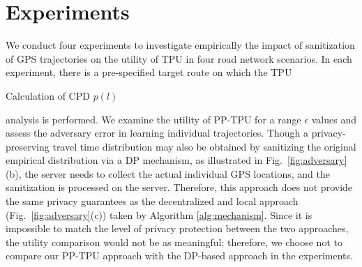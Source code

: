 \documentclass[10pt,journal,compsoc]{IEEEtran}
\begin{document}
\vspace{-9pt}\section{Experiments}\label{sec:exp}\vspace{-3pt}
We conduct four experiments to investigate empirically the impact of sanitization of GPS trajectories on the utility of TPU in four road network scenarios. In each experiment, there is a pre-specified target route on which the TPU 
\setlength{\textfloatsep}{0pt}
\begin{algorithm}
\caption{Calculation of CPD $p(l)$}\label{alg:CPD}
\SetAlgoLined
{}
\end{algorithm} 
analysis is performed.  We examine the utility of PP-TPU for a range $\epsilon$ values and assess the adversary error in learning individual trajectories. Though a privacy-preserving travel time distribution may also be obtained by sanitizing the original empirical distribution via a DP mechanism, as illustrated in Fig.~\ref{fig:adversary}(b), the server needs to collect the actual individual GPS locations, and the sanitization is processed on the server. Therefore, this approach does not provide the same privacy guarantees as the decentralized and local approach (Fig.~\ref{fig:adversary}(c)) taken by Algorithm \ref{alg:mechanism}. Since it is impossible to match the level of privacy protection between the two approaches, the utility comparison would not be as meaningful; therefore, we choose not to compare our PP-TPU approach with the DP-based approach in the experiments.   
\end{document}

